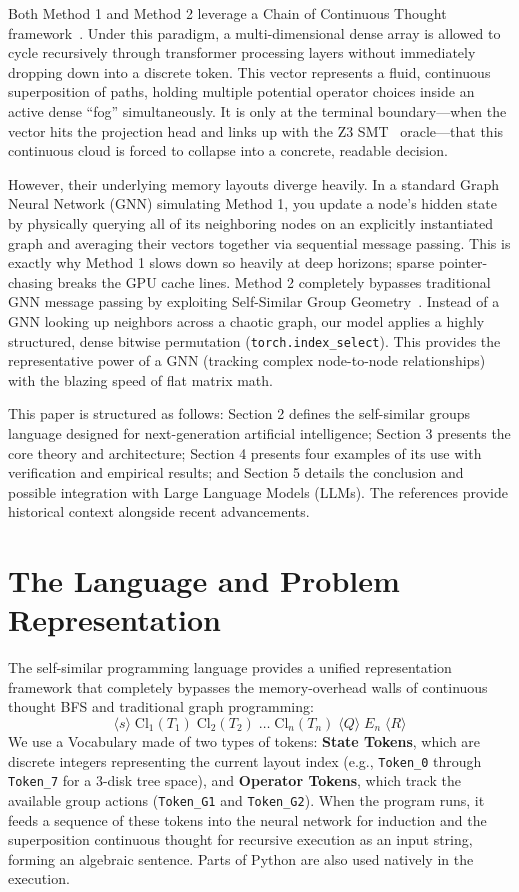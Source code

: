 \documentclass[twocolumn]{article}
\begin{document}
Both Method 1 and Method 2 leverage a Chain of Continuous Thought framework~\cite{zhu2025reasoning}. Under this paradigm, a multi-dimensional dense array is allowed to cycle recursively through transformer processing layers without immediately dropping down into a discrete token. This vector represents a fluid, continuous superposition of paths, holding multiple potential operator choices inside an active dense ``fog'' simultaneously. It is only at the terminal boundary—when the vector hits the projection head and links up with the Z3 SMT~\cite{de2008z3} oracle—that this continuous cloud is forced to collapse into a concrete, readable decision. 

However, their underlying memory layouts diverge heavily. In a standard Graph Neural Network (GNN) simulating Method 1, you update a node's hidden state by physically querying all of its neighboring nodes on an explicitly instantiated graph and averaging their vectors together via sequential message passing. This is exactly why Method 1 slows down so heavily at deep horizons; sparse pointer-chasing breaks the GPU cache lines. Method 2 completely bypasses traditional GNN message passing by exploiting Self-Similar Group Geometry~\cite{nekrashevych2005}. Instead of a GNN looking up neighbors across a chaotic graph, our model applies a highly structured, dense bitwise permutation (\texttt{torch.index\_select}). This provides the representative power of a GNN (tracking complex node-to-node relationships) with the blazing speed of flat matrix math.

This paper is structured as follows: Section 2 defines the self-similar groups language designed for next-generation artificial intelligence; Section 3 presents the core theory and architecture; Section 4 presents four examples of its use with verification and empirical results; and Section 5 details the conclusion and possible integration with Large Language Models (LLMs). The references provide historical context alongside recent advancements.

\section{The Language and Problem Representation}
The self-similar programming language provides a unified representation framework that completely bypasses the memory-overhead walls of continuous thought BFS and traditional graph programming:
\begin{equation}
    \langle s \rangle \; \text{Cl}_1(T_1) \; \text{Cl}_2(T_2) \; \dots \; \text{Cl}_n(T_n) \; \langle Q \rangle \; E_n \; \langle R \rangle
\end{equation}
We use a Vocabulary made of two types of tokens: \textbf{State Tokens}, which are discrete integers representing the current layout index (e.g., \texttt{Token\_0} through \texttt{Token\_7} for a 3-disk tree space), and \textbf{Operator Tokens}, which track the available group actions (\texttt{Token\_G1} and \texttt{Token\_G2}). When the program runs, it feeds a sequence of these tokens into the neural network for induction and the superposition continuous thought for recursive execution as an input string, forming an algebraic sentence. Parts of Python are also used natively in the execution.
\end{document}
